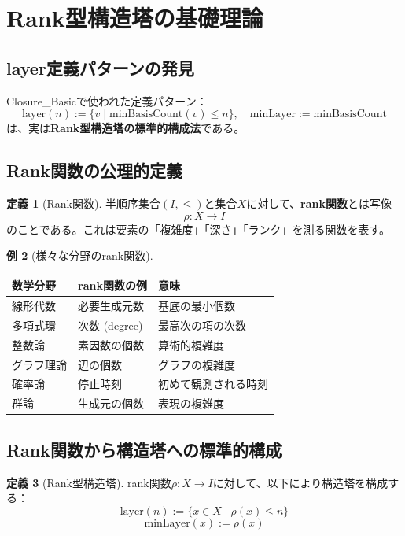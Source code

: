 \documentclass[a4paper,12pt]{ltjsarticle}
\theoremstyle{definition}
\newtheorem{definition}{定義}[section]
\newtheorem{example}[definition]{例}
\begin{document}
\section{Rank型構造塔の基礎理論}\label{sec:rank_basic}

\subsection{layer定義パターンの発見}

Closure\_Basicで使われた定義パターン：
$$\text{layer}(n) := \{v \mid \text{minBasisCount}(v) \leq n\}, \quad \text{minLayer} := \text{minBasisCount}$$
は、実は\textbf{Rank型構造塔の標準的構成法}である。

\subsection{Rank関数の公理的定義}

\begin{definition}[Rank関数]
半順序集合$(I, \leq)$と集合$X$に対して、\textbf{rank関数}とは写像
$$\rho: X \to I$$
のことである。これは要素の「複雑度」「深さ」「ランク」を測る関数を表す。
\end{definition}

\begin{example}[様々な分野のrank関数]
\begin{center}
\begin{tabular}{lll}
\hline
\textbf{数学分野} & \textbf{rank関数の例} & \textbf{意味} \\
\hline
線形代数 & 必要生成元数 & 基底の最小個数 \\
多項式環 & 次数 (degree) & 最高次の項の次数 \\
整数論 & 素因数の個数 & 算術的複雑度 \\
グラフ理論 & 辺の個数 & グラフの複雑度 \\
確率論 & 停止時刻 & 初めて観測される時刻 \\
群論 & 生成元の個数 & 表現の複雑度 \\
\hline
\end{tabular}
\end{center}
\end{example}

\subsection{Rank関数から構造塔への標準的構成}

\begin{definition}[Rank型構造塔]\label{def:rank_tower}
rank関数$\rho: X \to I$に対して、以下により構造塔を構成する：
$$\text{layer}(n) := \{x \in X \mid \rho(x) \leq n\}$$
$$\text{minLayer}(x) := \rho(x)$$
\end{definition}
\end{document}
